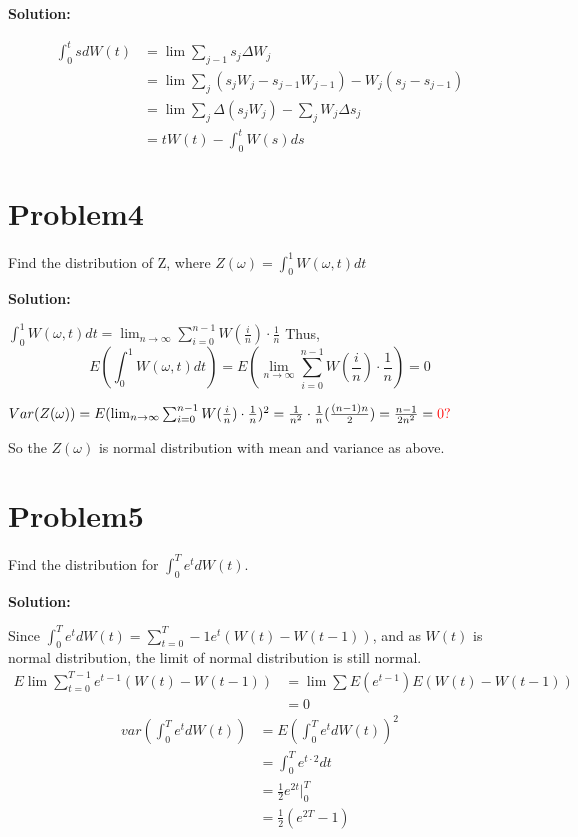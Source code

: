 \documentclass[11pt]{article} %
\begin{document}
\textbf{Solution:}

\begin{align*}
    \int_0^t s dW(t) &= \lim \sum_{j-1} s_j\Delta W_j\\ 
                    &=\lim \sum_j (s_j W_j - s_{j-1}W_{j-1})-W_j(s_j - s_{j-1})\\
                    &= \lim \sum_j \Delta(s_j W_j)-\sum_j W_j \Delta s_j\\
                    &= tW(t) - \int_0^t W(s) ds
\end{align*}



\section*{Problem4}
Find the distribution of Z, where $Z(\omega) = \int_0^1 W(\omega,t)dt$

\textbf{Solution:}

$\int_0^1 W(\omega,t)dt = \lim_{n\rightarrow \infty} \sum_{i = 0}^{n-1} W(\frac{i}{n})\cdot \frac{1}{n}$ Thus,
\begin{equation*}
    E(\int_0^1 W(\omega,t)dt ) = E(\lim_{n\rightarrow \infty} \sum_{i = 0}^{n-1} W(\frac{i}{n})\cdot \frac{1}{n}) = 0
\end{equation*}

$Var(Z(\omega)) = E(\lim_{n\rightarrow \infty} \sum_{i = 0}^{n-1} W(\frac{i}{n})\cdot \frac{1}{n})^2 = \frac{1}{n^2}\cdot \frac{1}{n}(\frac{(n-1)n}{2})=\frac{n-1}{2n^2}=\textcolor{red}{0?}$

So the $Z(\omega)$ is normal distribution with mean and variance as above. 

\section*{Problem5}
Find the distribution for $\int_0^T e^tdW(t)$.

\textbf{Solution:}

Since $\int_0^T e^t dW(t) = \sum_{t=0}^T-1 e^t(W(t)-W(t-1))$, and as $W(t)$ is normal distribution, the limit of normal distribution is still normal.
\begin{align*}
    E\lim\sum_{t=0}^{T-1} e^{t-1}(W(t)-W(t-1)) &= \lim \sum E(e^{t-1}) E(W(t)-W(t-1))\\
                                                &= 0
\end{align*}
\begin{align*}
    var(\int_0^T e^t dW(t)) &= E(\int_0^T e^t dW(t))^2\\
                            &= \int_0^T e^{t\cdot 2}dt\\
                            &= \frac{1}{2}e^{2t}|_0^T\\
                            &=\frac{1}{2}(e^{2T}-1)
\end{align*}
\end{document}
